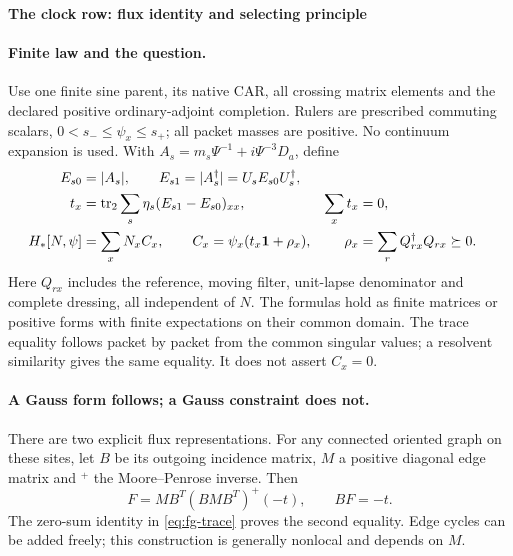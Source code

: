 \documentclass[10pt]{article}
\begin{document}
\begin{center}\textbf{The clock row: flux identity and selecting principle}\end{center}

\paragraph{Finite law and the question.}
Use one finite sine parent, its native CAR, all crossing matrix
elements and the declared positive ordinary-adjoint completion.
Rulers are prescribed commuting scalars, $0<s_-\leq\psi_x\leq s_+$;
all packet masses are positive. No continuum expansion is used.
With $A_s=m_s\Psi^{-1}+i\Psi^{-3}D_a$, define
\begin{align}
 E_{s0}&=|A_s|,\qquad E_{s1}=|A_s^\dagger|
                    =U_sE_{s0}U_s^\dagger,\notag\\
 t_x&=\operatorname{tr}_2\sum_s\eta_s(E_{s1}-E_{s0})_{xx},
       &\sum_xt_x&=0,\label{eq:fg-trace}\\
 H_*[N,\psi]&=\sum_xN_xC_x,\qquad
 C_x=\psi_x(t_x\mathbf1+\rho_x),
       &\rho_x&=\sum_rQ_{rx}^\dagger Q_{rx}\succeq0.
 \label{eq:fg-law}
\end{align}
Here $Q_{rx}$ includes the reference, moving filter, unit-lapse
denominator and complete dressing, all independent of $N$.
The formulas hold as finite matrices or positive forms with finite
expectations on their common domain. The trace equality follows
packet by packet from the common singular values; a resolvent
similarity gives the same equality. It does not assert $C_x=0$.

\paragraph{A Gauss form follows; a Gauss constraint does not.}
There are two explicit flux representations. For any connected
oriented graph on these sites, let $B$ be its outgoing incidence
matrix, $M$ a positive diagonal edge matrix and ${}^+$ the
Moore--Penrose inverse. Then
\[
 F=M B^T(BMB^T)^+(-t),\qquad BF=-t.
\]
The zero-sum identity in \eqref{eq:fg-trace} proves the second
equality. Edge cycles can be added freely; this construction is
generally nonlocal and depends on $M$.
\end{document}
